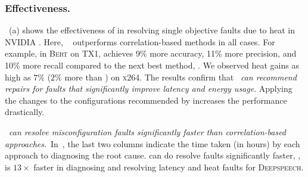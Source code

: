 \subsubsection{Effectiveness.}
~(a) shows the effectiveness of \ourapproach in resolving single objective faults due to heat in NVIDIA \txone. Here, \ourapproach ~{ outperforms correlation-based methods in all cases}. For example, in  \textsc{Bert} on TX1, \ourapproach achieves 9\% more accuracy, 11\% more precision, and 10\% more recall compared to the next best method, \bugdoc. We observed heat gains as high as $7\%$ ($2\%$ more than \bugdoc) on \textsc{x264}. The results confirm that \ourapproach~{\em can recommend repairs for faults that significantly improve latency and energy usage}. Applying the changes to the configurations recommended by \ourapproach increases the performance drastically. 



\ourapproach~{\em can resolve misconfiguration faults significantly faster than correlation-based approaches}.~In~, the last two columns indicate the time taken (in hours) by each approach to diagnosing the root cause. \ourapproach can do resolve faults significantly faster, \eg, \ourapproach is $13\times$ faster in diagnosing and resolving latency and heat faults for \textsc{Deepspeech}. 




